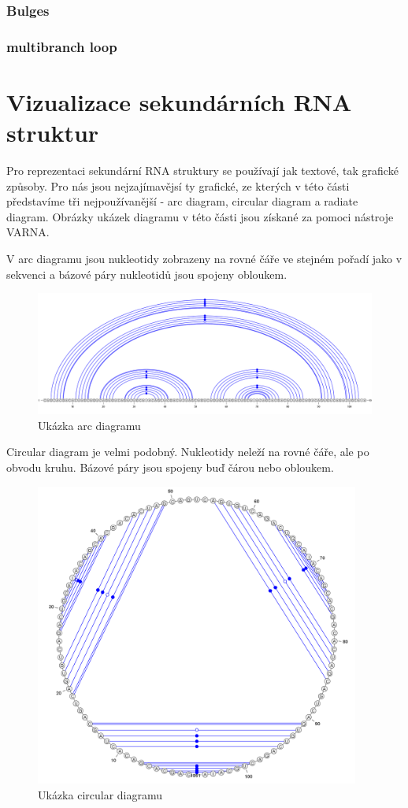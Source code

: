 \subsubsection{Bulges}

\subsubsection{multibranch loop}

\section{Vizualizace sekundárních RNA struktur} 

Pro reprezentaci sekundární RNA struktury se používají jak textové, tak
grafické způsoby. Pro nás jsou nejzajímavějsí ty grafické, ze kterých v této
části představíme tři nejpoužívanější - arc diagram, circular diagram a
radiate diagram. Obrázky ukázek diagramu v této části jsou získané za pomoci nástroje
VARNA\cite{Varna}.

V arc diagramu jsou nukleotidy zobrazeny na rovné čáře ve stejném pořadí jako v
sekvenci a bázové páry nukleotidů jsou spojeny obloukem.

\begin{figure}[H]
  \centering
  \includegraphics[width=140mm]{../img/kap01/arc.png}
  \caption{Ukázka arc diagramu}
\end{figure}

Circular diagram je velmi podobný. Nukleotidy neleží na rovné čáře, ale po
obvodu kruhu. Bázové páry jsou spojeny buď čárou nebo obloukem.

\begin{figure}[H]
  \centering
  \includegraphics[height=100mm]{../img/kap01/circular.png}
  \caption{Ukázka circular diagramu}
\end{figure}

